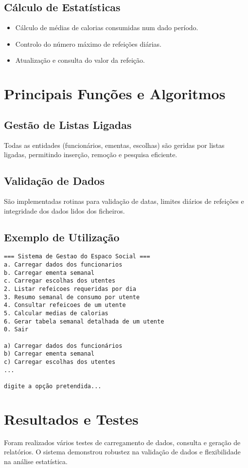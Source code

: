 \documentclass[a4paper,12pt]{report}
\begin{document}
\section{Cálculo de Estatísticas}
\begin{itemize}
    \item Cálculo de médias de calorias consumidas num dado período.
    \item Controlo do número máximo de refeições diárias.
    \item Atualização e consulta do valor da refeição.
\end{itemize}

\chapter{Principais Funções e Algoritmos}
\section{Gestão de Listas Ligadas}
Todas as entidades (funcionários, ementas, escolhas) são geridas por listas ligadas, permitindo inserção, remoção e pesquisa eficiente.

\section{Validação de Dados}
São implementadas rotinas para validação de datas, limites diários de refeições e integridade dos dados lidos dos ficheiros.

\section{Exemplo de Utilização}
\begin{verbatim}
=== Sistema de Gestao do Espaco Social ===
a. Carregar dados dos funcionarios
b. Carregar ementa semanal
c. Carregar escolhas dos utentes
2. Listar refeicoes requeridas por dia
3. Resumo semanal de consumo por utente
4. Consultar refeicoes de um utente
5. Calcular medias de calorias
6. Gerar tabela semanal detalhada de um utente
0. Sair

a) Carregar dados dos funcionários
b) Carregar ementa semanal
c) Carregar escolhas dos utentes
...

digite a opção pretendida...
\end{verbatim}

\chapter{Resultados e Testes}
Foram realizados vários testes de carregamento de dados, consulta e geração de relatórios. O sistema demonstrou robustez na validação de dados e flexibilidade na análise estatística.
\end{document}
